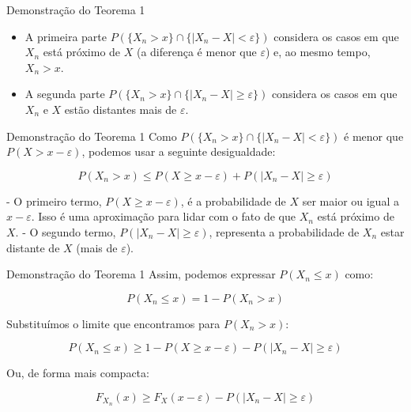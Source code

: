 \documentclass[12pt]{beamer}
\begin{document}
\begin{frame}{}
	\begin{block}{Demonstração do Teorema 1}
	\begin{itemize}
		\item A primeira parte \( P(\{X_n > x\} \cap \{|X_n - X| < \varepsilon\}) \) considera os casos em que \( X_n \) está próximo de \( X \) (a diferença é menor que \( \varepsilon \)) e, ao mesmo tempo, \( X_n > x \).
		\pause
		\item A segunda parte \( P(\{X_n > x\} \cap \{|X_n - X| \geq \varepsilon\}) \) considera os casos em que \( X_n \) e \( X \) estão distantes mais de \( \varepsilon \).
	\end{itemize}	
	\end{block}
\end{frame}

\begin{frame}{}
	\begin{block}{Demonstração do Teorema 1}
	Como \( P(\{X_n > x\} \cap \{|X_n - X| < \varepsilon\}) \) é menor que \( P(X > x - \varepsilon) \), podemos usar a seguinte desigualdade:
	
	\[
	P(X_n > x) \leq P(X \geq x - \varepsilon) + P(|X_n - X| \geq \varepsilon)
	\]
	
	- O primeiro termo, \( P(X \geq x - \varepsilon) \), é a probabilidade de \( X \) ser maior ou igual a \( x - \varepsilon \). Isso é uma aproximação para lidar com o fato de que \( X_n \) está próximo de \( X \).
	- O segundo termo, \( P(|X_n - X| \geq \varepsilon) \), representa a probabilidade de \( X_n \) estar distante de \( X \) (mais de \( \varepsilon \)).	
	\end{block}
\end{frame}

\begin{frame}{}
	\begin{block}{Demonstração do Teorema 1}
	Assim, podemos expressar \( P(X_n \leq x) \) como:
	
	\[
	P(X_n \leq x) = 1 - P(X_n > x)
	\]
	
	Substituímos o limite que encontramos para \( P(X_n > x) \):
	
	\[
	P(X_n \leq x) \geq 1 - P(X \geq x - \varepsilon) - P(|X_n - X| \geq \varepsilon)
	\]
	
	Ou, de forma mais compacta:
	
	\[
	F_{X_n}(x) \geq F_X(x - \varepsilon) - P(|X_n - X| \geq \varepsilon)
	\]	
	\end{block}
\end{frame}
\end{document}
